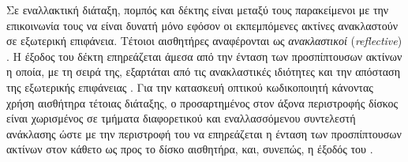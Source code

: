Σε εναλλακτική διάταξη, πομπός και δέκτης είναι μεταξύ τους παρακείμενοι με την
επικοινωνία τους να είναι δυνατή μόνο εφόσον οι εκπεμπόμενες ακτίνες ανακλαστούν
σε εξωτερική επιφάνεια. Τέτοιοι αισθητήρες αναφέρονται ως \emph{ανακλαστικοί}
 (\emph{reflective}) \parencite[3]{lynch02}.
Η έξοδος του δέκτη επηρεάζεται άμεσα από την ένταση των προσπίπτουσων ακτίνων η
οποία, με τη σειρά της, εξαρτάται από τις ανακλαστικές ιδιότητες και την
απόσταση της εξωτερικής επιφάνειας \parencite{vishay06}. Για την κατασκευή
οπτικού κωδικοποιητή κάνοντας χρήση αισθήτηρα τέτοιας διάταξης, ο προσαρτημένος
στον άξονα περιστροφής δίσκος είναι χωρισμένος σε τμήματα διαφορετικού και
εναλλασσόμενου συντελεστή ανάκλασης ώστε με την περιστροφή του να επηρεάζεται η
ένταση των προσπίπτουσων ακτίνων στον κάθετο ως προς το δίσκο αισθητήρα, και,
συνεπώς, η έξοδός του \parencite[11]{vishay02}.


